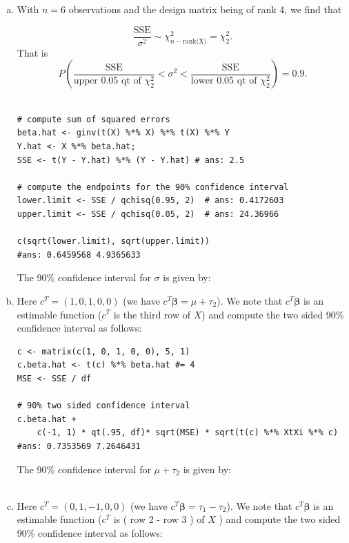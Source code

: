 \documentclass[paper=a4, fontsize=11pt]{scrartcl} %
\newcommand{\vecBeta}{\mathbf{\beta}}
\begin{document}
\begin{enumerate}[(a)]
\item With $n = 6$ observations and the design matrix being of rank 4, we find that 

$$\frac{\text{SSE}}{ \sigma^2}  \sim \chi^2_{n - \text{rank(X)}} = \chi^2_{2}.$$
That is
$$
P \left(\frac{\text{SSE}}{\text{upper  0.05 } \text{qt of }\chi^2_{2} }  <  \sigma^2 < \frac{\text{SSE}}{\text{lower  0.05 } \text{qt of }\chi^2_{2}}  \right) = 0.9.
$$\\
\begin{lstlisting}[basicstyle=\ttfamily\small\bfseries]
# compute sum of squared errors
beta.hat <- ginv(t(X) %*% X) %*% t(X) %*% Y
Y.hat <- X %*% beta.hat;  
SSE <- t(Y - Y.hat) %*% (Y - Y.hat) # ans: 2.5

# compute the endpoints for the 90% confidence interval
lower.limit <- SSE / qchisq(0.95, 2)  # ans: 0.4172603
upper.limit <- SSE / qchisq(0.05, 2)  # ans: 24.36966

c(sqrt(lower.limit), sqrt(upper.limit))
#ans: 0.6459568 4.9365633
\end{lstlisting}
The 90\% confidence interval for $\sigma$ is given by:
\\

\pagebreak

\item  Here $c^T = (1, 0, 1, 0, 0)$ (we have $c^T \vecBeta = \mu + \tau_2$). We note that 
 $c^T \vecBeta$ is an estimable function ($c^T$ is the third row of $X$) and compute the
 two sided 90\% confidence interval as follows:\\
 
 \begin{lstlisting}[basicstyle=\ttfamily\small\bfseries]
c <- matrix(c(1, 0, 1, 0, 0), 5, 1)
c.beta.hat <- t(c) %*% beta.hat #= 4
MSE <- SSE / df

# 90% two sided confidence interval
c.beta.hat +
    c(-1, 1) * qt(.95, df)* sqrt(MSE) * sqrt(t(c) %*% XtXi %*% c)
#ans: 0.7353569 7.2646431
\end{lstlisting}

 The 90\% confidence interval for $\mu + \tau_2$ is given by:
\\
 \\
 

\item  Here $c^T = (0, 1, -1, 0, 0)$ (we have $c^T \vecBeta = \tau_1 - \tau_2$). We note that 
 $c^T \vecBeta$ is an estimable function ($c^T$ is ( row 2 - row 3 ) of $X$  ) and compute the
 two sided 90\% confidence interval as follows:\\
 

\end{enumerate}
\end{document}
